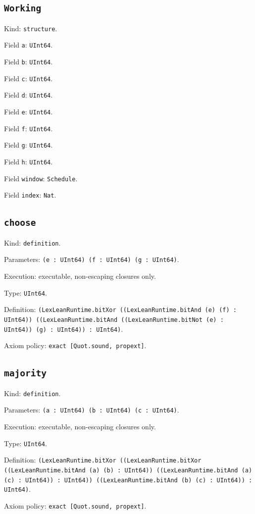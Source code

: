 \documentclass[11pt]{article}
\begin{document}
\subsection*{\texttt{Working}}
\noindent Kind: \texttt{structure}.\par
\noindent Field \texttt{a}: \texttt{UInt64}.\par
\noindent Field \texttt{b}: \texttt{UInt64}.\par
\noindent Field \texttt{c}: \texttt{UInt64}.\par
\noindent Field \texttt{d}: \texttt{UInt64}.\par
\noindent Field \texttt{e}: \texttt{UInt64}.\par
\noindent Field \texttt{f}: \texttt{UInt64}.\par
\noindent Field \texttt{g}: \texttt{UInt64}.\par
\noindent Field \texttt{h}: \texttt{UInt64}.\par
\noindent Field \texttt{window}: \texttt{Schedule}.\par
\noindent Field \texttt{index}: \texttt{Nat}.\par
\subsection*{\texttt{choose}}
\noindent Kind: \texttt{definition}.\par
\noindent Parameters: \texttt{(e : UInt64) (f : UInt64) (g : UInt64)}.\par
\noindent Execution: executable, non-escaping closures only.\par
\noindent Type: \texttt{UInt64}.\par
\noindent Definition: \texttt{(LexLeanRuntime.bitXor ((LexLeanRuntime.bitAnd (e) (f) : UInt64)) ((LexLeanRuntime.bitAnd ((LexLeanRuntime.bitNot (e) : UInt64)) (g) : UInt64)) : UInt64)}.\par
\noindent Axiom policy: \texttt{exact [Quot.sound, propext]}.\par
\subsection*{\texttt{majority}}
\noindent Kind: \texttt{definition}.\par
\noindent Parameters: \texttt{(a : UInt64) (b : UInt64) (c : UInt64)}.\par
\noindent Execution: executable, non-escaping closures only.\par
\noindent Type: \texttt{UInt64}.\par
\noindent Definition: \texttt{(LexLeanRuntime.bitXor ((LexLeanRuntime.bitXor ((LexLeanRuntime.bitAnd (a) (b) : UInt64)) ((LexLeanRuntime.bitAnd (a) (c) : UInt64)) : UInt64)) ((LexLeanRuntime.bitAnd (b) (c) : UInt64)) : UInt64)}.\par
\noindent Axiom policy: \texttt{exact [Quot.sound, propext]}.\par
\end{document}
